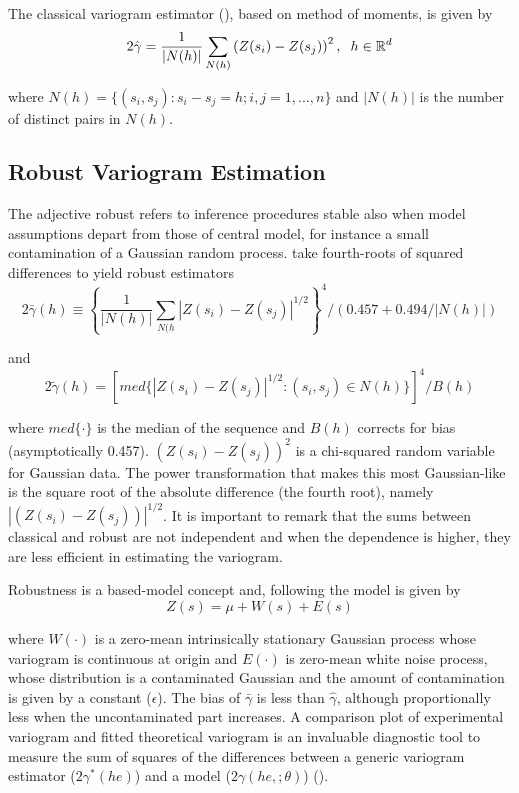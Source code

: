 \documentclass[
  12pt]{article}
\begin{document}
The classical variogram estimator (\citet{mat:1962}), based on method of
moments, is given by\\
\[2\hat{\gamma}=\frac{1}{|N(h)|}\sum_{N(h)}\left(Z(s_i)-Z(s_j)\right)^2, \hspace{2mm} h\in \mathbb{R}^d\]

where \(N(h)=\{(s_i,s_j):s_i-s_j=h; i,j=1,...,n\}\) and \(|N(h)|\) is
the number of distinct pairs in \(N(h)\).

\subsection{Robust Variogram
Estimation}\label{robust-variogram-estimation}

The adjective robust refers to inference procedures stable also when
model assumptions depart from those of central model, for instance a
small contamination of a Gaussian random process. \citet{cre:1980} take
fourth-roots of squared differences to yield robust estimators\\
\[2\bar{\gamma}(h)\equiv\left\{\frac{1}{|N(h)|}\sum_{N(h}|Z(s_i)-Z(s_j)|^{1/2}\right\}^4/(0.457+0.494/|N(h)|)\]

and
\[2\tilde{\gamma}(h)=[med\{|Z(s_i)-Z(s_j)|^{1/2}:(s_i,s_j) \in N(h)\}]^4/B(h)\]

where \(med\{\cdot\}\) is the median of the sequence and \(B(h)\)
corrects for bias (asymptotically 0.457). \((Z(s_i)-Z(s_j))^2\) is a
chi-squared random variable for Gaussian data. The power transformation
that makes this most Gaussian-like is the square root of the absolute
difference (the fourth root), namely \(|(Z(s_i)-Z(s_j))|^{1/2}\). It is
important to remark that the sums between classical and robust are not
independent and when the dependence is higher, they are less efficient
in estimating the variogram.

Robustness is a based-model concept and, following \citet{haw:1984} the
model is given by\\
\[Z(s)=\mu+W(s)+E(s)\]

where \(W(\cdot)\) is a zero-mean intrinsically stationary Gaussian
process whose variogram is continuous at origin and \(E(\cdot)\) is
zero-mean white noise process, whose distribution is a contaminated
Gaussian and the amount of contamination is given by a constant
(\(\epsilon\)). The bias of \(\bar{\gamma}\) is less than
\(\hat{\gamma}\), although proportionally less when the uncontaminated
part increases. A comparison plot of experimental variogram and fitted
theoretical variogram is an invaluable diagnostic tool to measure the
sum of squares of the differences between a generic variogram estimator
(\(2\gamma^{*}(he)\)) and a model (\(2\gamma(he,;\theta)\))
(\citet{haw:1984}).
\end{document}
